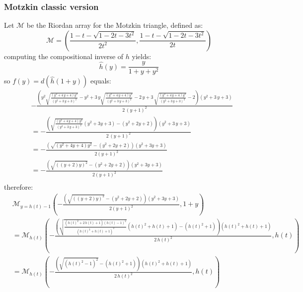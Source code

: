 \documentclass[11pt,a4paper]{article} %
\begin{document}
    \subsubsection{Motzkin classic version}

    Let $\mathcal{M}$ be the Riordan array for the Motzkin triangle, defined as:
    \begin{displaymath} 
        \mathcal{M} =\left( \frac{1-t-\sqrt{1-2t-3t^2}}{2t^2},
           \frac{1-t-\sqrt{1-2t-3t^2}}{2t}  \right)
    \end{displaymath} 
    computing the compositional inverse of $h$ yields:
    \begin{displaymath} 
        \hat{h}(y) = \frac{y}{1+y+y^2}
    \end{displaymath} 
    so $f(y)=d(\hat{h}(1+y))$ equals:
    \begin{displaymath} 
        \begin{split} 
            & -\frac{{\left(y^{2} \sqrt{\frac{{\left(y^{2} + 4 \, y + 4\right)} y^{2}}{{\left(y^{2} + 3 \, y + 3\right)}^{2}}} - y^{2} + 3 \, y \sqrt{\frac{{\left(y^{2} + 4 \, y + 4\right)} y^{2}}{{\left(y^{2} + 3 \, y + 3\right)}^{2}}} - 2 \, y + 3 \, \sqrt{\frac{{\left(y^{2} + 4 \, y + 4\right)} y^{2}}{{\left(y^{2} + 3 \, y + 3\right)}^{2}}} - 2\right)} {\left(y^{2} + 3 \, y + 3\right)}}{2 \, {\left(y + 1\right)}^{2}} \\
            & = -\frac{{ \left(\sqrt{\frac{{\left(y^{2} + 4 \, y + 4\right)} y^{2}}{{\left(y^{2} + 3 \, y + 3\right)}^{2}}} \left( y^{2}+3y+3 \right) -\left(y^{2}+2y+2\right)\right){\left(y^{2} + 3 \, y + 3\right)}}}{2 \, {\left(y + 1\right)}^{2}} \\
            & = -\frac{ \left(\sqrt{\left(y^{2} + 4 y + 4\right) y^{2}} -\left(y^{2}+2y+2\right)\right)\left(y^{2} + 3y + 3\right)}{2 {\left(y + 1\right)}^{2}} \\
            & = -\frac{ \left(\sqrt{\left(\left(y + 2\right) y\right)^{2}} -\left(y^{2}+2y+2\right)\right)\left(y^{2} + 3y + 3\right)}{2 {\left(y + 1\right)}^{2}} \\
        \end{split} 
    \end{displaymath} 
    therefore:
    \begin{displaymath} 
        \begin{split} 
            &\mathcal{M}_{y=h(t)-1}\left(
                -\frac{ \left(\sqrt{\left(\left(y + 2\right) y\right)^{2}} -\left(y^{2}+2y+2\right)\right)\left(y^{2} + 3y + 3\right)}{2 {\left(y + 1\right)}^{2}} , 1+y \right) \\
            &= \mathcal{M}_{h(t)}\left(
            -\frac{{\left(\sqrt{\frac{{\left(h(t)^{2} + 2 \, h(t) + 1\right)} {\left(h(t) - 1\right)}^{2}}{{\left(h(t)^{2} + h(t) + 1\right)}^{2}}}\left( h(t)^{2} + h(t) + 1\right) 
                - (h(t)^{2} + 1) \right)} {\left(h(t)^{2} + h(t) + 1\right)}}{2 \, h(t)^{2}} , h(t) \right)\\
            &= \mathcal{M}_{h(t)}\left(
            -\frac{{\left(\sqrt{\left(h(t)^2 - 1\right)^{2}} - (h(t)^{2} + 1) \right)} {\left(h(t)^{2} + h(t) + 1\right)}}{2 \, h(t)^{2}} , h(t) \right)\\
        \end{split} 
    \end{displaymath} 
\end{document}
